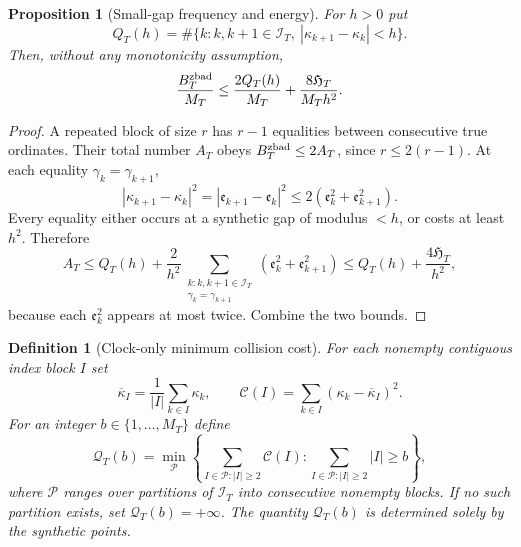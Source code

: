 \documentclass[11pt,reqno]{amsart}
\numberwithin{equation}{section}
\newtheorem{proposition}[theorem]{Proposition}
\newtheorem{definition}[theorem]{Definition}
\begin{document}
\begin{proposition}[Small-gap frequency and energy]
\label{prop:smallgapcertificate}
For $h>0$ put
\[
 Q_T(h)=\#\{k:k,k+1\in\mathcal I_T,
  \ |\kappa_{k+1}-\kappa_k|<h\}.
\]
Then, without any monotonicity assumption,
\begin{equation}\label{eq:smallgapcertificate}
 \frac{B_T^{\rm zbad}}{M_T}\le
 \frac{2Q_T(h)}{M_T}+\frac{8\mathfrak H_T}{M_T h^2}.
\end{equation}
\end{proposition}
\begin{proof}
A repeated block of size $r$ has $r-1$ equalities between consecutive
true ordinates. Their total number $A_T$ obeys
$B_T^{\rm zbad}\le2A_T$, since $r\le2(r-1)$.
At each equality $\gamma_k=\gamma_{k+1}$,
\[
 |\kappa_{k+1}-\kappa_k|^2
 =|\mathfrak e_{k+1}-\mathfrak e_k|^2\le2(\mathfrak e_k^2+\mathfrak e_{k+1}^2).
\]
Every equality either occurs at a synthetic gap of modulus $<h$,
or costs at least $h^2$. Therefore
\[
 A_T\le Q_T(h)+\frac2{h^2}
\sum_{\substack{k:k,k+1\in\mathcal I_T\\\gamma_k=\gamma_{k+1}}}
(\mathfrak e_k^2+\mathfrak e_{k+1}^2)
\le Q_T(h)+\frac{4\mathfrak H_T}{h^2},
\]
because each $\mathfrak e_k^2$ appears at most twice. Combine the two bounds.
\end{proof}

\begin{definition}[Clock-only minimum collision cost]
\label{def:collisioncost}
For each nonempty contiguous index block $I$ set
\begin{equation}\label{eq:collisioncost}
\overline\kappa_I=\frac1{|I|}\sum_{k\in I}\kappa_k,
\qquad
\mathcal C(I)=\sum_{k\in I}(\kappa_k-\overline\kappa_I)^2.
\end{equation}
For an integer $b\in\{1,\dots,M_T\}$ define
\begin{equation}\label{eq:Qcost}
 \mathcal Q_T(b)=\min_{\mathcal P}
 \left\{\sum_{I\in\mathcal P:|I|\ge2}\mathcal C(I):
 \sum_{I\in\mathcal P:|I|\ge2}|I|\ge b\right\},
\end{equation}
where $\mathcal P$ ranges over partitions of $\mathcal I_T$
into consecutive nonempty blocks.  If no such partition exists,
set $\mathcal Q_T(b)=+\infty$.  The quantity $\mathcal Q_T(b)$ is
determined solely by the synthetic points.
\end{definition}
\end{document}
